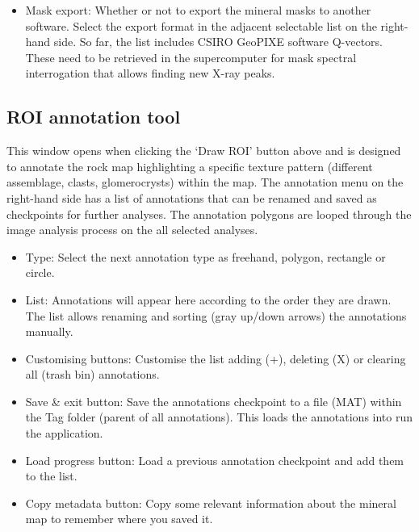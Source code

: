 \begin{itemize}
\begin{itemize}
						\begin{itemize}
							\item Pixel calibration $\mu$m/px): Pixel size of the input map. After QuPath, the map is usually half the dimensions of the original images in the image stack when prediction was done at Very High=2  (not Full) spatial resolution. Today, the information about the pixel calibration is not connected upstream in the pipeline (future work).
							\item Top mesh ($\mu$m): The grain size distribution (GSD) of each mineral is calculated in equal intervals from a bottom to a top mesh value. This is the largest value of the digital mesh aperture. 
							\item Bottom mesh (px): The minimum mesh used for GSD. It makes sense to define it in pixels since we visualise (measure) discretisation effects on fine-grained target minerals. 
						\end{itemize}
					\item Mask export: Whether or not to export the mineral masks to another software. Select the export format in the adjacent selectable list on the right-hand side. So far, the list includes CSIRO GeoPIXE software Q-vectors. These need to be retrieved in the supercomputer for mask spectral interrogation that allows finding new X-ray peaks.
				\end{itemize}
		\end{itemize}
	
	\subsection{ROI annotation tool}
	
	This window opens when clicking the `Draw ROI' button above and is designed to annotate the rock map highlighting a specific texture pattern (different assemblage, clasts, glomerocrysts) within the map. The annotation menu on the right-hand side has a list of annotations that can be renamed and saved as checkpoints for further analyses. The annotation polygons are looped through the image analysis process on the all selected analyses. 
	
	\begin{itemize}
		\item Type: Select the next annotation type as freehand, polygon, rectangle or circle.
		\item List: Annotations will appear here according to the order they are drawn. The list allows renaming and sorting (gray up/down arrows) the annotations manually.
		\item Customising buttons: Customise the list adding (+), deleting (X) or clearing all (trash bin) annotations.
		\item Save \& exit button: Save the annotations checkpoint to a file (MAT) within the Tag folder (parent of all annotations). This loads the annotations into run the application.
		\item Load progress button: Load a previous annotation checkpoint and add them to the list.
		\item Copy metadata button: Copy some relevant information about the mineral map to remember where you saved it.
	\end{itemize}